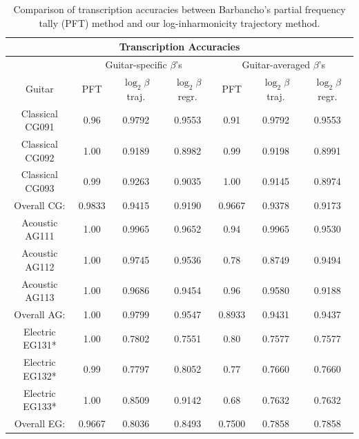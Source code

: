 \documentclass[12pt]{cmuthesis}
\begin{document}



\begin{table}[!htbp]
\begin{center}
\begin{tabular} {||c||c|c|c||c|c|c||}
\hline
\multicolumn{7}{|c|}{\bf{Transcription Accuracies}} \\
\hline
 & \multicolumn{3}{|c|}{Guitar-specific $\beta$'s} & \multicolumn{3}{|c|}{Guitar-averaged $\beta$'s}\\
\hline
Guitar & PFT & $\log_{2}\beta$ traj. & $\log_{2}\beta$ regr. & PFT & $\log_{2}\beta$ traj. & $\log_{2}\beta$ regr.\\
\hline
\hline
Classical CG091 & 0.96 & 0.9792 & 0.9553 & 0.91 & 0.9792 & 0.9553\\
\hline
Classical CG092 & 1.00 & 0.9189 & 0.8982 & 0.99 & 0.9198 &  0.8991\\
\hline
Classical CG093 & 0.99 & 0.9263 & 0.9035 & 1.00 & 0.9145 & 0.8974\\
\hline
Overall CG: & 0.9833 & 0.9415 & 0.9190 & 0.9667 & 0.9378 & 0.9173\\
\hline
\hline
Acoustic AG111 & 1.00 & 0.9965 & 0.9652 & 0.94 & 0.9965 & 0.9530 \\
\hline
Acoustic AG112 & 1.00 & 0.9745 & 0.9536 & 0.78 & 0.8749 & 0.9494 \\
\hline
Acoustic AG113  & 1.00 & 0.9686 & 0.9454 & 0.96 & 0.9580 & 0.9188\\
\hline
Overall AG: & 1.00 & 0.9799 & 0.9547 & 0.8933 & 0.9431 & 0.9437 \\
\hline
\hline
Electric EG131* & 1.00 & 0.7802 & 0.7551 & 0.80 & 0.7577 & 0.7577 \\
\hline
Electric EG132* & 0.99 & 0.7797 & 0.8052 & 0.77 & 0.7660 & 0.7660 \\
\hline
Electric EG133* & 1.00 & 0.8509 & 0.9142 & 0.68 & 0.7632  & 0.7632 \\
\hline
Overall EG: & 0.9667 & 0.8036 & 0.8493 & 0.7500 & 0.7858 & 0.7858\\
\hline
\end{tabular}
\caption{Comparison of transcription accuracies between Barbancho's partial frequency tally (PFT) method and our log-inharmonicity trajectory method.}
\label{tab:overall-results-RWC}
\end{center}
\end{table}
\end{document}
